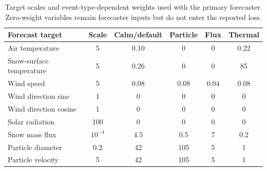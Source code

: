 \begin{table}[H]
  \centering
  \caption{Target scales and event-type-dependent weights used with the primary
  forecaster. Zero-weight variables remain forecaster inputs but
  do not enter the reported loss.}
  \label{tab:forecast_target_weights}
  \scriptsize
  \setlength{\tabcolsep}{3.0pt}
  \begin{tabular}{@{}lccccc@{}}
    \toprule
    Forecast target & Scale & Calm/default & Particle & Flux & Thermal \\
    \midrule
    Air temperature & 5 & 0.10 & 0 & 0 & 0.22 \\
    Snow-surface temperature & 5 & 0.26 & 0 & 0 & 85 \\
    Wind speed & 5 & 0.08 & 0.08 & 0.04 & 0.08 \\
    Wind direction sine & 1 & 0 & 0 & 0 & 0 \\
    Wind direction cosine & 1 & 0 & 0 & 0 & 0 \\
    Solar radiation & 100 & 0 & 0 & 0 & 0 \\
    Snow mass flux & $10^{-4}$ & 4.5 & 0.5 & 7 & 0.2 \\
    Particle diameter & 0.2 & 42 & 105 & 5 & 1 \\
    Particle velocity & 5 & 42 & 105 & 5 & 1 \\
    \bottomrule
  \end{tabular}
\end{table}

